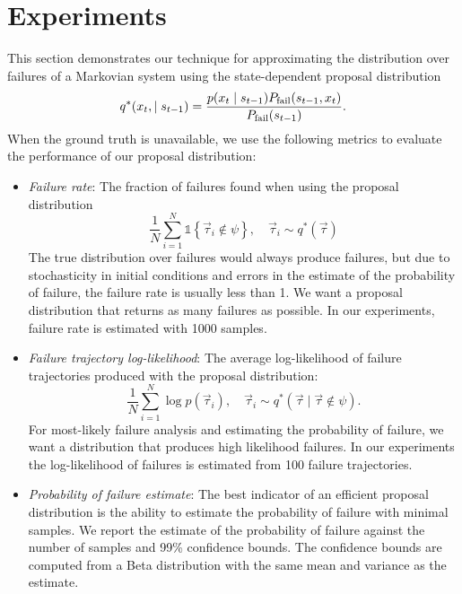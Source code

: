 \section{Experiments}
This section demonstrates our technique for approximating the distribution over failures of a Markovian system using the state-dependent proposal distribution
\begin{equation}
    q^*(x_t, \mid s_{t-1}) = \frac{p(x_t \mid s_{t-1}) P_{\rm fail}(s_{t-1}, x_t)}{P_{\rm fail}(s_{t-1})} \text{.} \label{eq:markov_disturbance_policy}
\end{equation}
When the ground truth is unavailable, we use the following metrics to evaluate the performance of our proposal distribution:
\begin{itemize}
    \item \emph{Failure rate}: The fraction of failures found when using the proposal distribution
    \begin{equation}
        \frac{1}{N} \sum_{i=1}^N \mathds{1}\left\{ \vec{\tau}_i \not \in \psi \right\}, \quad \vec{\tau}_i \sim q^*(\vec{\tau})
    \end{equation}
    The true distribution over failures would always produce failures, but due to stochasticity in initial conditions and errors in the estimate of the probability of failure, the failure rate is usually less than \num{1}. We want a proposal distribution that returns as many failures as possible. In our experiments, failure rate is estimated with \num{1000} samples. 
    \item \emph{Failure trajectory log-likelihood}: The average log-likelihood of failure trajectories produced with the proposal distribution: 
    \begin{equation}
        \frac{1}{N} \sum_{i=1}^N \log p(\vec{\tau}_i), \quad \vec{\tau}_i \sim q^*(\vec{\tau} \mid \vec{\tau} \not \in \psi) \text{.}
    \end{equation}
    For most-likely failure analysis and estimating the probability of failure, we want a distribution that produces high likelihood failures. In our experiments the log-likelihood of failures is estimated from \num{100} failure trajectories.
    \item \emph{Probability of failure estimate}: The best indicator of an efficient proposal distribution is the ability to estimate the probability of failure with minimal samples. We report the estimate of the probability of failure against the number of samples and \num{99}\% confidence bounds. The confidence bounds are computed from a Beta distribution with the same mean and variance as the estimate.
\end{itemize}

